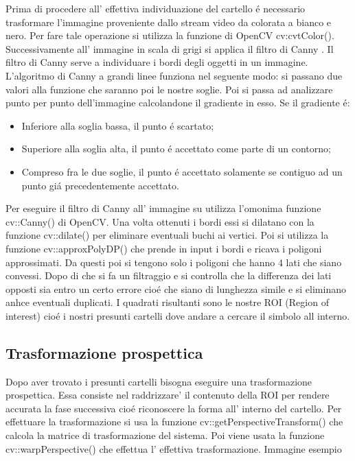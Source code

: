 	Prima di procedere all' effettiva individuazione del cartello \'e necessario trasformare l'immagine proveniente dallo stream video da colorata a bianco e nero. Per fare tale operazione si utilizza la funzione di OpenCV cv:cvtColor(). Successivamente all' immagine  in scala di grigi si applica il filtro di Canny \cite{canny}. Il filtro di Canny serve a individuare i bordi degli oggetti in un immagine. L'algoritmo di Canny a grandi linee funziona nel seguente modo: si passano due valori alla funzione che saranno poi le nostre soglie. Poi si passa ad analizzare punto per punto dell'immagine calcolandone il gradiente in esso.  Se il gradiente \'e:
	\begin{itemize}
		\item Inferiore alla soglia bassa, il punto \'e scartato;
		\item Superiore alla soglia alta, il punto \'e accettato come parte di un contorno;
		\item Compreso fra le due soglie, il punto \'e accettato solamente se contiguo ad un punto gi\'a precedentemente accettato.
	\end{itemize}
	Per eseguire il filtro di Canny all' immagine su utilizza l'omonima funzione cv::Canny() di OpenCV.
	Una volta ottenuti i bordi essi si dilatano con la funzione cv::dilate() per eliminare eventuali buchi ai vertici.
	Poi si utilizza la funzione cv::approxPolyDP() che prende in input i bordi e ricava i poligoni approssimati.
	Da questi poi si tengono solo i poligoni che hanno 4 lati che siano convessi.
	Dopo di che si fa un  filtraggio e si controlla che la differenza dei lati opposti sia entro un certo errore cio\'e che siano di lunghezza simile e si eliminano anhce eventuali duplicati.
	I quadrati risultanti sono le nostre ROI (Region of interest) cio\'e i nostri presunti cartelli dove andare a cercare il simbolo all interno.

\subsection{Trasformazione prospettica}

	Dopo aver trovato i presunti cartelli bisogna eseguire una trasformazione prospettica. Essa consiste nel raddrizzare' il contenuto della ROI per rendere accurata la fase successiva cio\'e riconoscere la forma all' interno del cartello.
	Per effettuare la trasformazione si usa la funzione cv::getPerspectiveTransform() che calcola la matrice di trasformazione del sistema. Poi viene usata la funzione cv::warpPerspective() che effettua l' effettiva trasformazione.
	Immagine esempio

